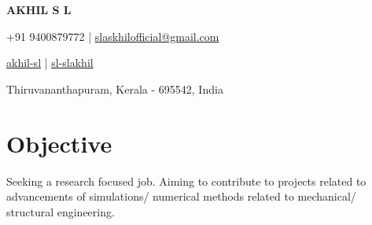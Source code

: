 \documentclass[a4paper,11pt]{article}
\newcommand{\socialicon}[1]{\raisebox{-0.05em}{\resizebox{!}{1em}{#1}}}
\newcommand{\headerfontiii}{\fontfamily{ppl}\selectfont} %
\begin{document}
	\headerfontiii
	
	\begin{center}
		{\Huge\textbf{AKHIL S L}}
	\end{center}
	\vspace{-6mm}
	
	\begin{center}
		\small{
			+91 9400879772 | \href{mailto:slaskhilofficial@gmail.com}{slaskhilofficial@gmail.com} 
		}
	\end{center}
	\vspace{-6mm}
	
	\begin{center}
		\small{
			\socialicon{\faLinkedin} \href{https://www.linkedin.com/in/akhil-sl-88a697b9/}{akhil-sl} | 
			\socialicon{\faGithub} \href{https://github.com/sl-slakhil}{sl-slakhil} 
		}
	\end{center}
	\vspace{-6mm}
	\begin{center}
		\small{Thiruvananthapuram, Kerala - 695542, India}
	\end{center}
	
	\vspace{-4mm}
	
	\section{\textbf{Objective}}
	\vspace{1mm}
	\small{
		Seeking a research focused job. Aiming to contribute to projects related to advancements of simulations/ numerical methods related to mechanical/ structural engineering.
	}
	\vspace{-2mm}
	
	
	
\end{document}
